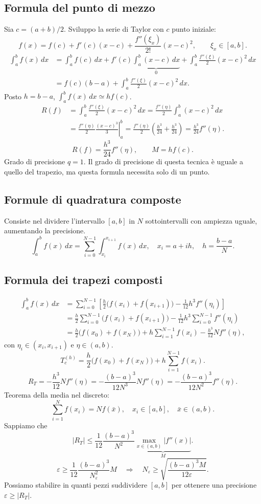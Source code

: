 \subsection*{Formula del punto di mezzo}
Sia $c=(a+b)/2$. Sviluppo la serie di Taylor con $c$ punto iniziale:
\[f(x)=f(c)+f'(c)(x-c)+\frac{f''(\xi_x)}{2!}(x-c)^2,\qquad\xi_x\in[a,b].\]
\begin{align*}
\int_a^b f(x)\,dx&=\int_a^b f(c)\,dx+f'(c)\underbrace{\int_a^b(x-c)\,dx}_{0}
+\int_a^b\frac{f''(\xi)}2(x-c)^2\,dx\\
&=f(c)(b-a)+\int_a^b\frac{f''(\xi)}2(x-c)^2\,dx.
\end{align*}
Posto $h=b-a$, $\int_a^b f(x)\,dx\simeq hf(c)$.
\begin{align*}
R(f)&=\int_a^b\frac{f''(\xi)}2(x-c)^2\,dx
=\frac{f''(\eta)}2\int_a^b(x-c)^2\,dx\\
&=\frac{f''(\eta)}2\left.\frac{(x-c)^3}3\right|_a^b
=\frac{f''(\eta)}2\left(\frac{h^3}{24}+\frac{h^3}{24}\right)=\frac{h^3}{24}f''(\eta).
\end{align*}
\[\boxed{R(f)=\frac{h^3}{24}f''(\eta)},\qquad\boxed{M=hf(c)}.\]
Grado di precisione $q=1$. Il grado di precisione di questa tecnica è uguale a quello del trapezio, ma questa formula necessita solo di un punto.
\subsection*{Formule di quadratura composte}
Consiste nel dividere l'intervallo $[a,b]$ in $N$ sottointervalli con ampiezza uguale, aumentando la precisione.
\[\int_a^b f(x)\,dx=\sum_{i=0}^{N-1}\int_{x_i}^{x_{i+1}} f(x)\,dx,\quad x_i=a+ih,\quad h=\frac{b-a}N.\]
\subsection*{Formula dei trapezi composti}
\begin{align*}
\int_a^b f(x)\,dx&=\sum_{i=0}^{N-1}\left[\frac h2\bigl(f(x_i)+f(x_{i+1})\bigr)-\frac1{12}h^3f''(\eta_i)\right]\\
&=\frac h2\sum_{i=0}^{N-1}\bigl(f(x_i)+f(x_{i+1})\bigr)-\frac1{12}h^3\sum_{i=0}^{N-1}f''(\eta_i)\\
&=\frac h2\bigl(f(x_0)+f(x_N)\bigr)+h\sum_{i=1}^{N-1}f(x_i)-\frac{h^3}{12}Nf''(\eta),
\end{align*}
con $\eta_i\in(x_i,x_{i+1})$ e $\eta\in(a,b)$.
\[\boxed{T_c^{(h)}=\frac h2\bigl(f(x_0)+f(x_N)\bigr)+h\sum_{i=1}^{N-1}f(x_i)}.\]
\[R_T=-\frac{h^3}{12}Nf''(\eta)=-\frac{(b-a)^3}{12N^3}Nf''(\eta)
=\boxed{-\frac{(b-a)^3}{12N^2}f''(\eta)}.\]
Teorema della media nel discreto:
\[\sum_{i=1}^N f(x_i)=Nf(\bar x),\quad x_i\in[a,b],\quad\bar x\in(a,b).\]
Sappiamo che
\[|R_T|\le\frac1{12}\frac{(b-a)^3}{N^2}\underbrace{\max_{x\in(a,b)}|f''(x)|}_{M}.\]
\[\varepsilon\ge\frac1{12}\frac{(b-a)^3}{N_\varepsilon^2}M
\quad\Longrightarrow\quad N_\varepsilon\ge\sqrt{\frac{(b-a)^3M}{12\varepsilon}}.\]
Possiamo stabilire in quanti pezzi suddividere $[a,b]$ per ottenere una precisione $\varepsilon\ge|R_T|$.
